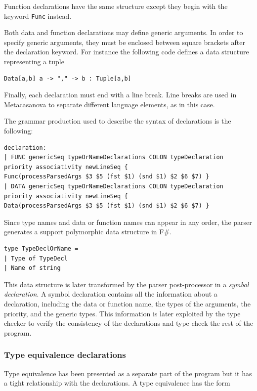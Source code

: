 Function declarations have the same structure except they begin with the keyword \texttt{Func} instead.

Both data and function declarations may define generic arguments. In order to specify generic arguments, they must be enclosed between square brackets after the declaration keyword. For instance the following code defines a data structure representing a tuple

\begin{lstlisting}
Data[a,b] a -> "," -> b : Tuple[a,b]
\end{lstlisting}

Finally, each declaration must end with a line break. Line breaks are used in Metacasanova to separate different language elements, as in this case.

The grammar production used to describe the syntax of declarations is the following:

\begin{lstlisting}
declaration:
| FUNC genericSeq typeOrNameDeclarations COLON typeDeclaration priority associativity newLineSeq {
Func(processParsedArgs $3 $5 (fst $1) (snd $1) $2 $6 $7) }
| DATA genericSeq typeOrNameDeclarations COLON typeDeclaration priority associativity newLineSeq {
Data(processParsedArgs $3 $5 (fst $1) (snd $1) $2 $6 $7) }
\end{lstlisting}

Since type names and data or function names can appear in any order, the parser generates a support polymorphic data structure in F\#.

\begin{lstlisting}
type TypeDeclOrName =
| Type of TypeDecl
| Name of string
\end{lstlisting}

This data structure is later transformed by the parser post-processor in a \textit{symbol declaration}. A symbol declaration contains all the information about a declaration, including the data or function name, the types of the arguments, the priority, and the generic types. This information is later exploited by the type checker to verify the consistency of the declarations and type check the rest of the program.

\subsubsection{Type equivalence declarations}
Type equivalence has been presented as a separate part of the program but it has a tight relationship with the declarations. A type equivalence has the form

